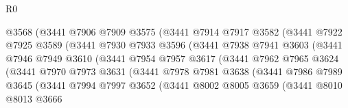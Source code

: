 \begin{lexlean}{R0}
\begin{coremodule}
                          @3568
                          (@3441
                            @7906
                            @7909
                            @3575
                            (@3441
                              @7914
                              @7917
                              @3582
                              (@3441
                                @7922
                                @7925
                                @3589
                                (@3441
                                  @7930
                                  @7933
                                  @3596
                                  (@3441
                                    @7938
                                    @7941
                                    @3603
                                    (@3441
                                      @7946
                                      @7949
                                      @3610
                                      (@3441
                                        @7954
                                        @7957
                                        @3617
                                        (@3441
                                          @7962
                                          @7965
                                          @3624
                                          (@3441
                                            @7970
                                            @7973
                                            @3631
                                            (@3441
                                              @7978
                                              @7981
                                              @3638
                                              (@3441
                                                @7986
                                                @7989
                                                @3645
                                                (@3441
                                                  @7994
                                                  @7997
                                                  @3652
                                                  (@3441
                                                    @8002
                                                    @8005
                                                    @3659
                                                    (@3441
                                                      @8010
                                                      @8013
                                                      @3666

\end{coremodule}
\end{lexlean}
